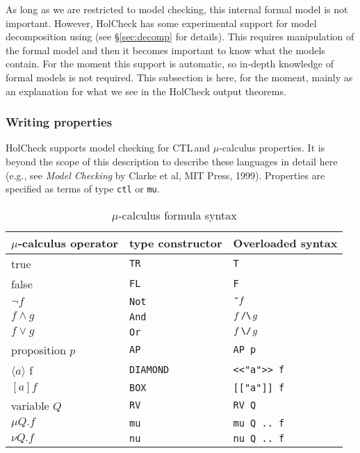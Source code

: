 \documentclass[12pt,fleqn]{article}
\newcommand{\ctl}{\textsf{CTL}\,}
\newcommand{\hc}{HolCheck}
\newcommand{\hand}{\texttt{/\char'134}}
\newcommand{\hor}{\texttt{\char'134/}}
\newcommand{\hnot}{\texttt{\~{}}}
\begin{document}
As long as we are restricted to model checking, this internal formal model is not important. However, \hc{} has some experimental support for model decomposition using \HOL{} (see \S\ref{sec:decomp} for details). This requires manipulation of the formal model and then it becomes important to know what the models contain. For the moment this support is automatic, so in-depth knowledge of formal models is not required. This subsection is here, for the moment, mainly as an explanation for what we see in the \hc{} output theorems.

\subsubsection{Writing properties}\label{sec:prop}

\hc{} supports model checking for \ctl and \(\mu\)-calculus properties. It is beyond the scope of this description to describe these languages in detail here (e.g., see \emph{Model Checking} by Clarke et al, MIT Press, 1999). Properties are specified as \HOL{} terms of type \texttt{ctl} or \texttt{mu}.

\begin{table}
\caption{\HOL{} \(\mu\)-calculus formula syntax}
\label{tab_mu}
\begin{tabular}{|l|l|l|}
\hline
\(\mu\)-calculus operator & \HOL{} type constructor & Overloaded syntax \\
\hline
true & \texttt{TR} & \texttt{T} \\
false & \texttt{FL} & \texttt{F} \\
$\lnot f$ & \texttt{Not} & $\hnot f$  \\
$f \land g$ & \texttt{And} & $f\, \hand\, g$ \\
$f \lor g$ & \texttt{Or} & $f\, \hor\, g$ \\
proposition $p$ & \texttt{AP} & \texttt{AP p} \\
$\langle a \rangle$ f& \texttt{DIAMOND} & \verb+<<"a">> f+ \\
$[a] f$  & \texttt{BOX} & \verb+[["a"]] f+ \\
variable $Q$ & \texttt{RV} & \texttt{RV Q} \\
$\mu Q . f$ & \texttt{mu} & \texttt{mu Q .. f} \\
$\nu Q . f$ & \texttt{nu} & \texttt{nu Q .. f} \\
\hline
\end{tabular}
\end{table}
\end{document}
